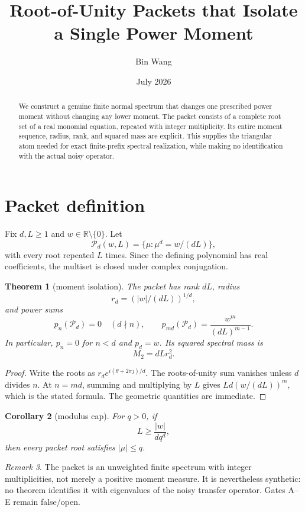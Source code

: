 \documentclass[11pt]{article}
\title{Root-of-Unity Packets that Isolate a Single Power Moment}
\author{Bin Wang}\date{July 2026}
\newtheorem{theorem}{Theorem}[section]
\newtheorem{corollary}[theorem]{Corollary}
\theoremstyle{remark}\newtheorem{remark}[theorem]{Remark}
\begin{document}
\maketitle
\begin{abstract}
We construct a genuine finite normal spectrum that changes one prescribed
power moment without changing any lower moment.  The packet consists of a
complete root set of a real monomial equation, repeated with integer
multiplicity.  Its entire moment sequence, radius, rank, and squared mass are
explicit.  This supplies the triangular atom needed for exact finite-prefix
spectral realization, while making no identification with the actual noisy
operator.
\end{abstract}

\section{Packet definition}
Fix $d,L\ge1$ and $w\in\mathbb R\setminus\{0\}$.  Let
\[
 \mathcal P_d(w,L)=
 \{\mu:\mu^d=w/(dL)\},
\]
with every root repeated $L$ times.  Since the defining polynomial has real
coefficients, the multiset is closed under complex conjugation.

\begin{theorem}[moment isolation]
The packet has rank $dL$, radius
\[
 r_d=(|w|/(dL))^{1/d},
\]
and power sums
\[
 p_n(\mathcal P_d)=0\quad(d\nmid n),
 \qquad
 p_{md}(\mathcal P_d)=\frac{w^m}{(dL)^{m-1}}.
\]
In particular, $p_n=0$ for $n<d$ and $p_d=w$.  Its squared spectral mass is
\[
 M_2=dLr_d^2.
\]
\end{theorem}
\begin{proof}
Write the roots as $r_de^{i(\theta+2\pi j)/d}$.  The roots-of-unity sum
vanishes unless $d$ divides $n$.  At $n=md$, summing and multiplying by $L$
gives $Ld(w/(dL))^m$, which is the stated formula.  The geometric quantities
are immediate.
\end{proof}

\begin{corollary}[modulus cap]
For $q>0$, if
\[
 L\ge\frac{|w|}{dq^d},
\]
then every packet root satisfies $|\mu|\le q$.
\end{corollary}

\begin{remark}
The packet is an unweighted finite spectrum with integer multiplicities, not
merely a positive moment measure.  It is nevertheless synthetic: no theorem
identifies it with eigenvalues of the noisy transfer operator.  Gates A--E
remain false/open.
\end{remark}
\end{document}

